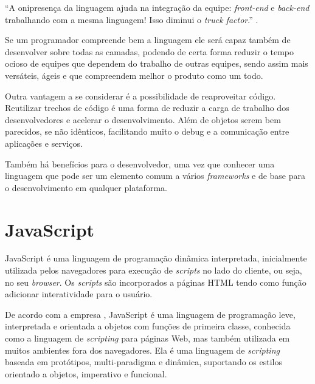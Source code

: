 \documentclass[
	12pt,				%
	openright,			%
	twoside,			%
	a4paper,			%
	english,			%
	brazil				%
	]{abntex2}
\begin{document}
{\begin{adjustwidth}{4cm}{0cm}
    “A onipresença da linguagem ajuda na integração da equipe: \textit{front-end} e \textit{back-end} trabalhando com a mesma linguagem! Isso diminui o \textit{truck factor}.” \cite{flavioalmeida_meanstack}.
\end{adjustwidth}}

Se um programador compreende bem a linguagem ele será capaz também de desenvolver sobre todas as camadas, podendo de certa forma reduzir o tempo ocioso de equipes que dependem do trabalho de outras equipes, sendo assim mais versáteis, ágeis e que compreendem melhor o produto como um todo.

Outra vantagem a se considerar é a possibilidade de reaproveitar código. Reutilizar trechos de código é uma forma de reduzir a carga de trabalho dos desenvolvedores e acelerar o desenvolvimento. Além de objetos serem bem parecidos, se não idênticos, facilitando muito o debug e a comunicação entre aplicações e serviços.

Também há benefícios para o desenvolvedor, uma vez que conhecer uma linguagem que pode ser um elemento comum a vários \textit{frameworks} e de base para o desenvolvimento em qualquer plataforma.

\section{JavaScript}


JavaScript é uma linguagem de programação dinâmica interpretada, inicialmente utilizada pelos navegadores para execução de \textit{scripts} no lado do cliente, ou seja, no seu \textit{browser}. Os \textit{scripts} são incorporados a páginas HTML tendo como função adicionar interatividade para o usuário.

De acordo com a empresa \citeauthor{mdn_javascript}, JavaScript é uma linguagem de programação leve, interpretada e orientada a objetos com funções de primeira classe, conhecida como a linguagem de \textit{scripting} para páginas Web, mas também utilizada em muitos ambientes fora dos navegadores. Ela é uma linguagem de \textit{scripting} baseada em protótipos, multi-paradigma e dinâmica, suportando os estilos orientado a objetos, imperativo e funcional.
\end{document}
